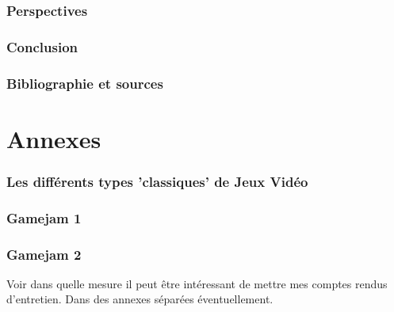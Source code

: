 \documentclass[11pt]{article} %
\begin{document}
	\newpage
	\section{Perspectives}
	
	
	\newpage
	\section{Conclusion}
	
	
	\newpage
	\section{Bibliographie et sources}
	

\newpage
\part{Annexes} \appendix
	\section{Les différents types 'classiques' de Jeux Vidéo}
	
	\section{Gamejam 1}
	
	
	\section{Gamejam 2}
	

Voir dans quelle mesure il peut être intéressant de mettre mes comptes rendus d'entretien. Dans des annexes séparées éventuellement.
\end{document}
